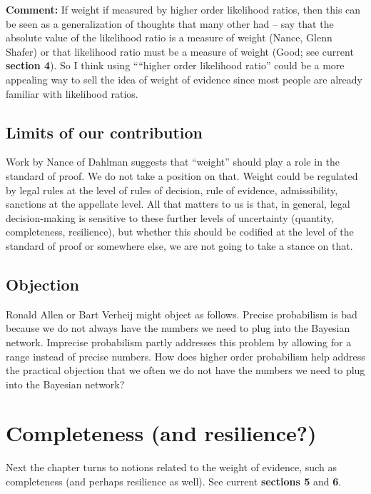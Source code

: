 \documentclass[
  10pt,
  dvipsnames,enabledeprecatedfontcommands]{scrartcl}
\begin{document}
\textbf{Comment:} If weight if measured by higher order likelihood
ratios, then this can be seen as a generalization of thoughts that many
other had -- say that the absolute value of the likelihood ratio is a
measure of weight (Nance, Glenn Shafer) or that likelihood ratio must be
a measure of weight (Good; see current \textbf{section 4}). So I think
using ````higher order likelihood ratio'' could be a more appealing way
to sell the idea of weight of evidence since most people are already
familiar with likelihood ratios.

\hypertarget{limits-of-our-contribution}{%
\subsection{Limits of our
contribution}\label{limits-of-our-contribution}}

Work by Nance of Dahlman suggests that ``weight'' should play a role in
the standard of proof. We do not take a position on that. Weight could
be regulated by legal rules at the level of rules of decision, rule of
evidence, admissibility, sanctions at the appellate level. All that
matters to us is that, in general, legal decision-making is sensitive to
these further levels of uncertainty (quantity, completeness,
resilience), but whether this should be codified at the level of the
standard of proof or somewhere else, we are not going to take a stance
on that.

\hypertarget{objection}{%
\subsection{Objection}\label{objection}}

Ronald Allen or Bart Verheij might object as follows. Precise
probabilism is bad because we do not always have the numbers we need to
plug into the Bayesian network. Imprecise probabilism partly addresses
this problem by allowing for a range instead of precise numbers. How
does higher order probabilism help address the practical objection that
we often we do not have the numbers we need to plug into the Bayesian
network?

\hypertarget{completeness-and-resilience}{%
\section{Completeness (and
resilience?)}\label{completeness-and-resilience}}

Next the chapter turns to notions related to the weight of evidence,
such as completeness (and perhaps resilience as well). See current
\textbf{sections 5} and \textbf{6}.
\end{document}

